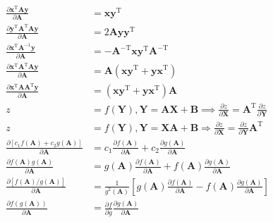 \documentclass[UTF8,space=auto]{ctexart} %
\begin{document}
\begin{align}
\frac{\partial \mathbf{x}^{\mathrm{T}} \mathbf{A} \mathbf{y}}{\partial \mathbf{A}} &= \mathbf{x y}^{\mathrm{T}} \\
\frac{\partial \mathbf{y}^{\mathrm{T}} \mathbf{A}^{\mathrm{T}} \mathbf{A} \mathbf{y}}{\partial \mathbf{A}} &= 2 \mathbf{A} \mathbf{y} \mathbf{y}^{\mathrm{T}} \\
\frac{\partial \mathbf{x}^{\mathrm{T}} \mathbf{A}^{-1} \mathbf{y}}{\partial \mathbf{A}}&=-\mathbf{A}^{-\mathrm{T}} \mathbf{x} \mathbf{y}^{\mathrm{T}} \mathbf{A}^{-\mathrm{T}} \\
\frac{\partial \mathbf{x}^{\mathrm{T}} \mathbf{A}^{\mathrm{T}} \mathbf{A} \mathbf{y}}{\partial \mathbf{A}}&=\mathbf{A}\left(\mathbf{x} \mathbf{y}^{\mathrm{T}}+\mathbf{y} \mathbf{x}^{\mathrm{T}}\right) \\
\frac{\partial \mathbf{x}^{\mathrm{T}} \mathbf{A} \mathbf{A}^{\mathrm{T}} \mathbf{y}}{\partial \mathbf{A}}&=\left(\mathbf{x} \mathbf{y}^{\mathrm{T}}+\mathbf{y} \mathbf{x}^{\mathrm{T}}\right) \mathbf{A} \\
z&=f(\mathbf{Y}), \mathbf{Y}=\mathbf{A} \mathbf{X}+\mathbf{B} \implies \frac{\partial z}{\partial \mathbf{X}}=\mathbf{A}^{\mathrm{T}} \frac{\partial z}{\partial \mathbf{Y}} \\
z&=f(\mathbf{Y}), \mathbf{Y}=\mathbf{X} \mathbf{A}+\mathbf{B} \Longrightarrow \frac{\partial z}{\partial \mathbf{X}}=\frac{\partial z}{\partial \mathbf{Y}} \mathbf{A}^{\mathrm{T}} \\
\frac{\partial\left[c_{1} f(\mathbf{A})+c_{2} g(\mathbf{A})\right]}{\partial \mathbf{A}}&=c_{1} \frac{\partial f(\mathbf{A})}{\partial \mathbf{A}}+c_{2} \frac{\partial g(\mathbf{A})}{\partial \mathbf{A}} \\
\frac{\partial f(\mathbf{A}) g(\mathbf{A})}{\partial \mathbf{A}}&=g(\mathbf{A}) \frac{\partial f(\mathbf{A})}{\partial \mathbf{A}}+f(\mathbf{A}) \frac{\partial g(\mathbf{A})}{\partial \mathbf{A}} \\
\frac{\partial \left[ f(\mathbf{A}) / g(\mathbf{A}) \right] }{\partial \mathbf{A}}&=\frac{1}{g^{2}(\mathbf{A})}\left[g(\mathbf{A}) \frac{\partial f(\mathbf{A})}{\partial \mathbf{A}}-f(\mathbf{A}) \frac{\partial g(\mathbf{A})}{\partial \mathbf{A}}\right] \\
\frac{\partial f(g(\mathbf{A}))}{\partial \mathbf{A}}&=\frac{\partial f}{\partial g} \frac{\partial g(\mathbf{A})}{\partial \mathbf{A}}
\end{align}
\end{document}
